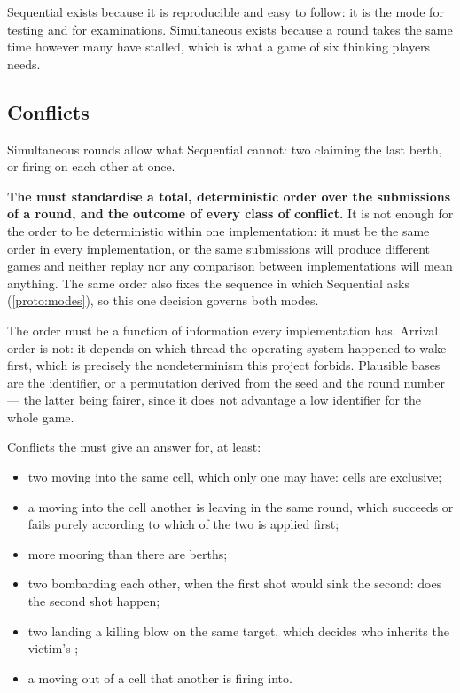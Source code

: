 \documentclass{article}
\begin{document}
Sequential exists because it is reproducible and easy to follow: it is the mode for testing and for
examinations. Simultaneous exists because a round takes the same time however many \ships have
stalled, which is what a game of six thinking players needs.

\subsection{Conflicts}
\label{proto:conflicts}

Simultaneous rounds allow what Sequential cannot: two \ships claiming the last berth, or firing on
each other at once.

\textbf{The \WG{} must standardise a total, deterministic order over the submissions of a round,
and the outcome of every class of conflict.} It is not enough for the order to be deterministic
within one implementation: it must be the same order in every implementation, or the same
submissions will produce different games and neither replay nor any comparison between
implementations will mean anything. The same order also fixes the sequence in which Sequential
asks (\cref{proto:modes}), so this one decision governs both modes.

The order must be a function of information every implementation has. Arrival order is not: it
depends on which thread the operating system happened to wake first, which is precisely the
nondeterminism this project forbids. Plausible bases are the \ship{} identifier, or a permutation
derived from the seed and the round number --- the latter being fairer, since it does not advantage
a low identifier for the whole game.

Conflicts the \WG{} must give an answer for, at least:

\begin{itemize}
    \item two \ships moving into the same cell, which only one may have: cells are exclusive;
    \item a \ship{} moving into the cell another \ship{} is leaving in the same round, which
      succeeds or fails purely according to which of the two is applied first;
    \item more \ships mooring than there are berths;
    \item two \ships bombarding each other, when the first shot would sink the second: does the
      second shot happen;
    \item two \ships landing a killing blow on the same target, which decides who inherits the
      victim's \clues{};
    \item a \ship{} moving out of a cell that another \ship{} is firing into.
\end{itemize}
\end{document}
